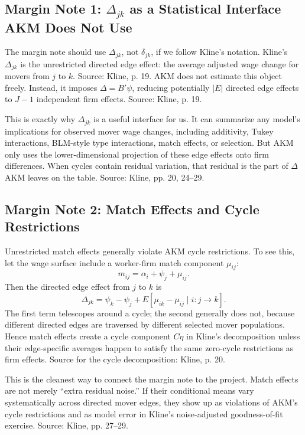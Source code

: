 \documentclass[11pt]{article}
\begin{document}
\subsection{Margin Note 1: $\Delta_{jk}$ as a Statistical Interface AKM Does Not Use}

The margin note should use $\Delta_{jk}$, not $\delta_{jk}$, if we follow Kline's notation.
Kline's $\Delta_{jk}$ is the unrestricted directed edge effect: the average adjusted wage
change for movers from $j$ to $k$. Source: Kline, p. 19. AKM does not estimate this
object freely. Instead, it imposes $\Delta=B'\psi$, reducing potentially $|E|$ directed
edge effects to $J-1$ independent firm effects. Source: Kline, p. 19.

This is exactly why $\Delta_{jk}$ is a useful interface for us. It can summarize any
model's implications for observed mover wage changes, including additivity, Tukey
interactions, BLM-style type interactions, match effects, or selection. But AKM only
uses the lower-dimensional projection of these edge effects onto firm differences.
When cycles contain residual variation, that residual is the part of $\Delta$ AKM leaves
on the table. Source: Kline, pp. 20, 24--29.

\subsection{Margin Note 2: Match Effects and Cycle Restrictions}

Unrestricted match effects generally violate AKM cycle restrictions. To see this, let
the wage surface include a worker-firm match component $\mu_{ij}$:
\[
m_{ij}=\alpha_i+\psi_j+\mu_{ij}.
\]
Then the directed edge effect from $j$ to $k$ is
\[
\Delta_{jk}
=\psi_k-\psi_j+
E[\mu_{ik}-\mu_{ij}\mid i:j\to k].
\tag{derived}
\]
The first term telescopes around a cycle; the second generally does not, because
different directed edges are traversed by different selected mover populations. Hence
match effects create a cycle component $C\dot\eta$ in Kline's decomposition unless
their edge-specific averages happen to satisfy the same zero-cycle restrictions as firm
effects. Source for the cycle decomposition: Kline, p. 20.

This is the cleanest way to connect the margin note to the project. Match effects are
not merely ``extra residual noise.'' If their conditional means vary systematically across
directed mover edges, they show up as violations of AKM's cycle restrictions and as
model error in Kline's noise-adjusted goodness-of-fit exercise. Source: Kline, pp. 27--29.
\end{document}
